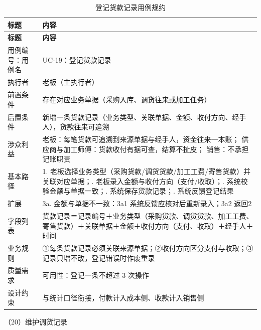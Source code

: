 {\small
\begin{longtable}{@{}L{3.0cm} L{12.3cm}@{}}
\caption{登记货款记录用例规约}\label{tab:uc-19}\\
\toprule
\textbf{标题} & \textbf{内容} \\
\midrule
\endfirsthead
\toprule
\textbf{标题} & \textbf{内容} \\
\midrule
\endhead
用例编号：用例名 & UC-19：登记货款记录 \\
\midrule
执行者 & 老板（主执行者） \\
\midrule
前置条件 & 存在对应业务单据（采购入库、调货往来或加工任务） \\
\midrule
后置条件 & 新增一条货款记录（业务类型、关联单据、金额、收付方向、经手人），货款往来可追溯 \\
\midrule
涉众利益 & 老板：每笔货款可追溯到来源单据与经手人，资金往来一本账；\newline
供应商与加工师傅：货款收付有据可查，结算不扯皮；\newline
销售：不承担记账职责 \\
\midrule
基本路径 & 1. 老板选择业务类型（采购货款/调货货款/加工工费/寄售货款）并关联对应单据；. 老板录入金额与收付方向（支付/收取）；. 系统校验金额与单据一致；. 系统保存货款记录；. 系统反馈登记结果 \\
\midrule
扩展 & 3a. 金额与单据不一致：3a1 系统反馈应核对后重新录入；3a2 返回2 \\
\midrule
字段列表 & 货款记录＝记录编号＋业务类型（采购货款、调货货款、加工工费、寄售货款）＋关联单据＋金额＋收付方向（支付、收取）＋经手人＋时间 \\
\midrule
业务规则 & ①每条货款记录必须关联来源单据；\newline ②收付方向区分支付与收取；\newline ③记录只增不改，登记错误时作废重录 \\
\midrule
质量需求 & 可用性：登记一条不超过 3 次操作 \\
\midrule
设计约束 & 与统计口径衔接，付款计入成本侧、收款计入销售侧 \\
\midrule
\bottomrule
\end{longtable}}

\noindent（20）维护调货记录

